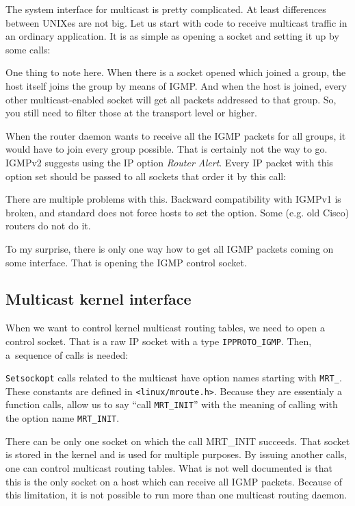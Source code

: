 The system interface for multicast is pretty complicated. At least differences
between UNIXes are not big. Let us start with code to receive multicast traffic
in an ordinary application. It is as simple as opening a socket and setting it
up by some \setsockopt calls:


\noindent One thing to note here. When there is a socket opened which joined a group, the host itself joins the group by means of IGMP. And when the host is
joined, every other multicast-enabled socket will get all packets addressed to that
group. So, you still need to filter those at the transport level or higher.

When the router daemon wants to receive all the IGMP packets for all groups, it
would have to join every group possible. That is certainly not the way to go.
IGMPv2 suggests using the IP option \emph{Router Alert}. Every IP packet with this option
set should be passed to all sockets that order it by this \setsockopt call:


\noindent There are multiple problems with this. Backward compatibility with
IGMPv1 is broken, and standard does not force hosts to set the option. Some (e.g.
old Cisco) routers do not do it.

To my surprise, there is only one way how to get all IGMP packets coming on
some interface. That is opening the IGMP control socket.

\subsection{Multicast kernel interface}

When we want to control kernel multicast routing tables, we need to open
a control socket. That is a raw IP socket with a type \texttt{IPPROTO\_IGMP}.
Then, a~sequence of \setsockopt calls is needed:


\texttt{Setsockopt} calls related to the multicast have option names starting
with \texttt{MRT\_}. These constants are defined in \texttt{<linux/mroute.h>}.
Because they are essentialy a function calls, allow us to say ``call
\texttt{MRT\_INIT}'' with the meaning of calling \setsockopt with the option
name \texttt{MRT\_INIT}.

There can be only one socket on which the call MRT\_INIT succeeds. That socket
is stored in the kernel and is used for multiple purposes. By issuing another
\setsockopt calls, one can control multicast routing tables. What is not well
documented is that this is the only socket on a host which can receive all IGMP
packets. Because of this limitation, it is not possible to run more than one
multicast routing daemon.

